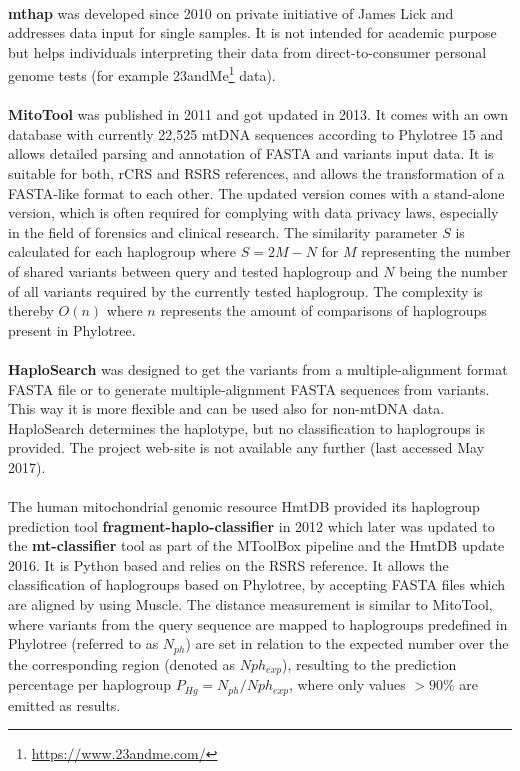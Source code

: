 \\
\textbf{mthap} was developed since 2010 on private initiative of James Lick and addresses data input for single samples. It is not intended for academic purpose but helps individuals interpreting their data from direct-to-consumer personal genome tests (for example 23andMe\footnote{\url{https://www.23andme.com/}} data).\\
\\
\textbf{MitoTool} was published in 2011 and got updated in 2013. It comes with an own database with currently 22,525 mtDNA sequences according to Phylotree 15 and allows detailed parsing and annotation of FASTA and variants input data. It is suitable for both, rCRS and RSRS references, and allows the transformation of a FASTA-like format to each other. The updated version comes with a stand-alone version, which is often required for complying with data privacy laws, especially in the field of forensics and clinical research. The similarity parameter $S$ is calculated for each haplogroup where $S=2M-N$ for $M$ representing the number of shared variants between query and tested haplogroup and $N$ being the number of all variants required by the currently tested haplogroup. The complexity is thereby $O(n)$ where $n$ represents the amount of comparisons of haplogroups present in Phylotree.\\
\\ 
\textbf{HaploSearch} was designed to get the variants from a multiple-alignment format FASTA file or to generate multiple-alignment FASTA sequences from variants. This way it is more flexible and can be used also for non-mtDNA data. HaploSearch determines the haplotype, but no classification to haplogroups is provided. The project web-site is not available any further (last accessed May 2017).\\
\\
The human mitochondrial genomic resource HmtDB provided its haplogroup prediction tool \textbf{fragment-haplo-classifier} in 2012 which later was updated to the \textbf{mt-classifier} tool as part of the MToolBox pipeline and the HmtDB update 2016. It is Python based and relies on the RSRS reference. It allows the classification of haplogroups based on Phylotree, by accepting FASTA files which are aligned by using Muscle. The distance measurement is similar to MitoTool, where variants from the query sequence are mapped to haplogroups predefined in Phylotree (referred to as $N_{ph}$) are set in relation to the expected number over the the corresponding region (denoted as $Nph_{exp}$), resulting to the prediction percentage per haplogroup $P_{Hg}=N_{ph}/Nph_{exp}$, where only values $>90\%$ are emitted as results.\\
